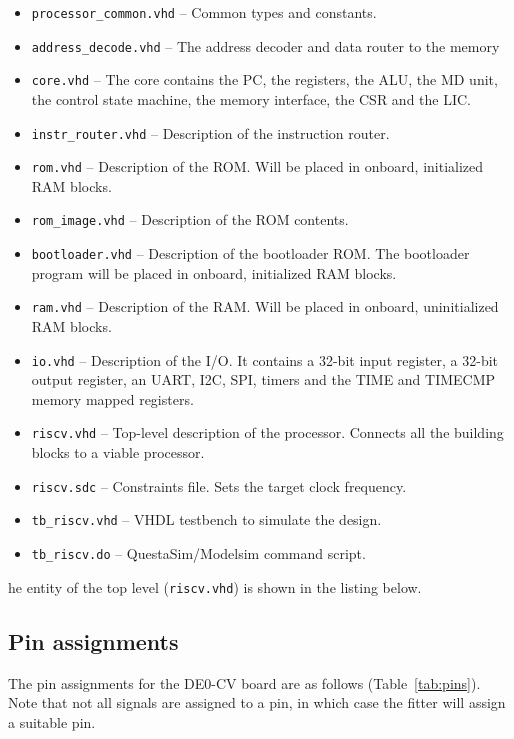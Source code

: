 \documentclass[12pt]{article}
\begin{document}
\begin{itemize}
\item \lstinline|processor_common.vhd| -- Common types and constants.
\item \lstinline|address_decode.vhd| -- The address decoder and data router to the memory \item \lstinline|core.vhd| -- The core contains the PC, the registers, the ALU, the MD unit, the control state machine, the memory interface, the CSR and the LIC.
\item \lstinline|instr_router.vhd| -- Description of the instruction router.
\item \lstinline|rom.vhd| -- Description of the ROM. Will be placed in onboard, initialized RAM blocks. 
\item \lstinline|rom_image.vhd| -- Description of the ROM contents.
\item \lstinline|bootloader.vhd| -- Description of the bootloader ROM. The bootloader program will be placed in onboard, initialized RAM blocks. 
\item \lstinline|ram.vhd| -- Description of the RAM. Will be placed in onboard, uninitialized RAM blocks. 
\item \lstinline|io.vhd| -- Description of the I/O. It contains a 32-bit input register, a 32-bit output register, an UART, I2C, SPI, timers and the TIME and TIMECMP memory mapped registers.
\item \lstinline|riscv.vhd| -- Top-level description of the processor. Connects all the building blocks to a viable processor.
\item \lstinline|riscv.sdc| -- Constraints file. Sets the target clock frequency.
\item \lstinline|tb_riscv.vhd| -- VHDL testbench to simulate the design.
\item \lstinline|tb_riscv.do| -- QuestaSim/Modelsim command script.
\end{itemize}


he entity of the top level (\lstinline|riscv.vhd|) is shown in the listing below.



\subsection{Pin assignments}
The pin assignments for the DE0-CV board are as follows (Table~\ref{tab:pins}). Note that not all signals are assigned to a pin, in which case the fitter will assign a suitable pin.
\end{document}
